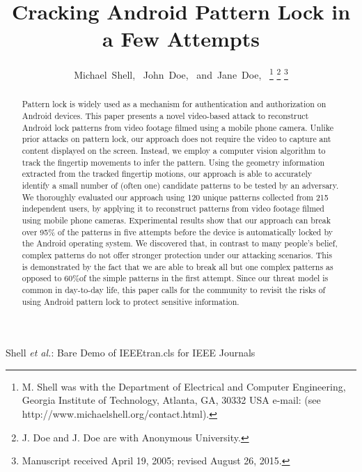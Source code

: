 \documentclass[journal]{IEEEtran}
\begin{document}
\title{Cracking Android Pattern Lock in a Few Attempts}


\author{Michael~Shell,~
        John~Doe,~
        and~Jane~Doe,~%
\thanks{M. Shell was with the Department
of Electrical and Computer Engineering, Georgia Institute of Technology, Atlanta,
GA, 30332 USA e-mail: (see http://www.michaelshell.org/contact.html).}%
\thanks{J. Doe and J. Doe are with Anonymous University.}%
\thanks{Manuscript received April 19, 2005; revised August 26, 2015.}}



%
{Shell \MakeLowercase{\textit{et al.}}: Bare Demo of IEEEtran.cls for IEEE Journals}

\maketitle

\begin{abstract}
    Pattern lock is widely used as a mechanism for authentication and authorization on Android devices. This paper presents a novel video-based attack to reconstruct Android lock patterns from video footage filmed using a mobile phone camera. Unlike prior attacks on pattern lock, our approach does not require the video to capture ant content displayed on the screen. Instead, we employ a computer vision algorithm to track the fingertip movements to infer the pattern. Using the geometry information extracted from the tracked fingertip motions, our approach is able to accurately identify a small number of (often one) candidate patterns to be tested by an adversary. We thoroughly evaluated our approach using 120 unique patterns collected from 215 independent users, by applying it to reconstruct patterns from video footage filmed using mobile phone cameras. Experimental results show that our approach can break over 95\% of the patterns in five attempts before the device is automatically locked by the Android operating system. We discovered that, in contrast to many people's belief, complex patterns do not offer stronger protection under our attacking scenarios. This is demonstrated by the fact that we are able to break all but one complex patterns as opposed to 60\%of the simple patterns in the first attempt. Since our threat model is common in day-to-day life, this paper calls for the community to revisit the risks of using Android pattern lock to protect sensitive information.
\end{abstract}
\end{document}
